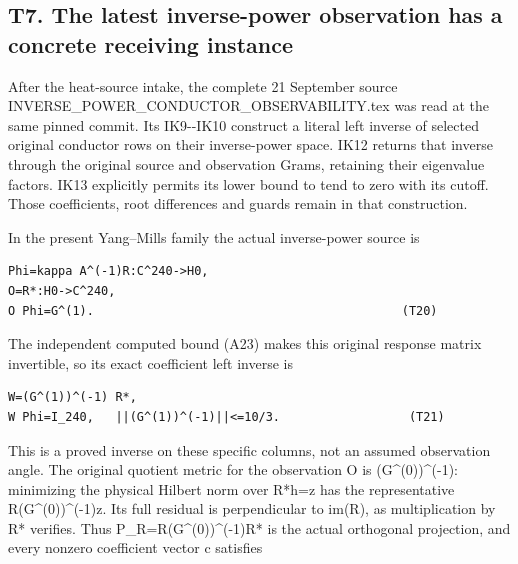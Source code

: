 \documentclass[11pt,a4paper]{article}
\renewcommand{\[}{\begingroup\small\originaldisplaystart}
\renewcommand{\]}{\originaldisplayend\endgroup}
\begin{document}
\subsection{T7. The latest inverse-power observation has a concrete
receiving
instance}\label{t7.-the-latest-inverse-power-observation-has-a-concrete-receiving-instance}

After the heat-source intake, the complete 21 September source
{I\allowbreak{}N\allowbreak{}V\allowbreak{}E\allowbreak{}R\allowbreak{}S\allowbreak{}E\allowbreak{}\_\allowbreak{}P\allowbreak{}O\allowbreak{}W\allowbreak{}E\allowbreak{}R\allowbreak{}\_\allowbreak{}C\allowbreak{}O\allowbreak{}N\allowbreak{}D\allowbreak{}U\allowbreak{}C\allowbreak{}T\allowbreak{}O\allowbreak{}R\allowbreak{}\_\allowbreak{}O\allowbreak{}B\allowbreak{}S\allowbreak{}E\allowbreak{}R\allowbreak{}V\allowbreak{}A\allowbreak{}B\allowbreak{}I\allowbreak{}L\allowbreak{}I\allowbreak{}T\allowbreak{}Y\allowbreak{}.\allowbreak{}t\allowbreak{}e\allowbreak{}x\allowbreak{}}
was read at the same pinned commit. Its IK9-\/-IK10 construct a literal
left inverse of selected original conductor rows on their inverse-power
space. IK12 returns that inverse through the original source and
observation Grams, retaining their eigenvalue factors. IK13 explicitly
permits its lower bound to tend to zero with its cutoff. Those
coefficients, root differences and guards remain in that construction.

In the present Yang--Mills family the actual inverse-power source is

\begin{verbatim}
Phi=kappa A^(-1)R:C^240->H0,
O=R*:H0->C^240,
O Phi=G^(1).                                           (T20)
\end{verbatim}

The independent computed bound (A23) makes this original response matrix
invertible, so its exact coefficient left inverse is

\begin{verbatim}
W=(G^(1))^(-1) R*,
W Phi=I_240,   ||(G^(1))^(-1)||<=10/3.                  (T21)
\end{verbatim}

This is a proved inverse on these specific columns, not an assumed
observation angle. The original quotient metric for the observation O is
(G\^{}(0))\^{}(-1): minimizing the physical Hilbert norm over R*h=z has
the representative R(G\^{}(0))\^{}(-1)z. Its full residual is
perpendicular to im(R), as multiplication by R* verifies. Thus
{P\allowbreak{}\_\allowbreak{}R\allowbreak{}=\allowbreak{}R\allowbreak{}(\allowbreak{}G\allowbreak{}\textasciicircum{}\allowbreak{}(\allowbreak{}0\allowbreak{})\allowbreak{})\allowbreak{}\textasciicircum{}\allowbreak{}(\allowbreak{}-\allowbreak{}1\allowbreak{})\allowbreak{}R\allowbreak{}*\allowbreak{}}
is the actual orthogonal projection, and every nonzero coefficient
vector c satisfies
\end{document}
